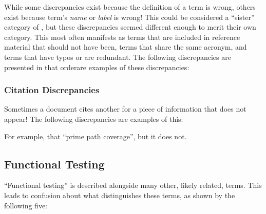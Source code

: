 While some discrepancies exist because the definition of a term is wrong,
others exist because term's \emph{name} or \emph{label} is wrong! This could be
considered a ``sister'' category of , but these
discrepancies seemed different enough to merit their own category. \ifnotpaper
    This most often manifests as terms that are included in reference material
    that should not have been, terms that share the same acronym, and terms
    that have typos or are redundant. \fi The following \ifnotpaper
    discrepancies are presented in that order\else are examples of these
    discrepancies\fi:



\subsubsection{Citation Discrepancies}
\label{cites}

Sometimes a document cites another for a piece of information that does not
appear! \ifnotpaper
    The following discrepancies are examples of this:
    
\else
    For example, \citet[p.~184]{DoğanEtAl2014}  that
    \citet{SakamotoEtAl2013}  ``prime path coverage'',
    but it does not.
\fi


\subsection{Functional Testing}
\label{func-test-discrep}

``Functional testing'' is described alongside many other, likely related,
terms. This leads to confusion about what distinguishes these terms, as shown
by the following five:

